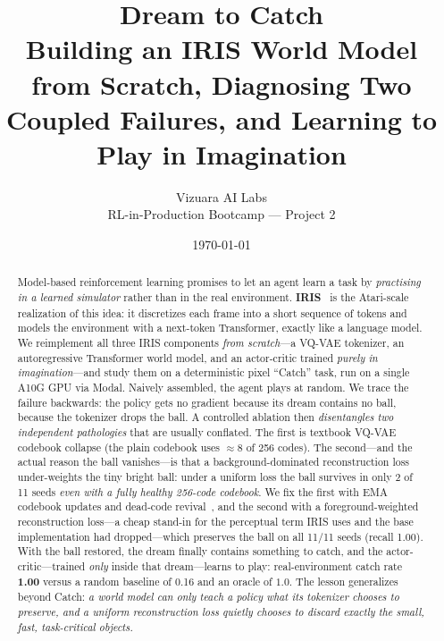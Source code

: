 \documentclass[11pt]{article}
\title{\textbf{Dream to Catch}\\[2pt]
\large Building an IRIS World Model from Scratch, Diagnosing Two Coupled
Failures, and Learning to Play in Imagination}
\author{Vizuara AI Labs \\ \small RL-in-Production Bootcamp --- Project 2}
\date{\today}
\newcommand{\activeAfter}{256}
\newcommand{\nseeds}{11}
\newcommand{\keptEMA}{2}
\newcommand{\keptFG}{11}
\newcommand{\ballFG}{1.00}           %
\newcommand{\activePlain}{8}         %
\newcommand{\catchRate}{1.00}
\newcommand{\randCatch}{0.16}
\begin{document}
\maketitle

\begin{abstract}
Model-based reinforcement learning promises to let an agent learn a task by
\emph{practising in a learned simulator} rather than in the real environment.
\textbf{IRIS}~\cite{iris} is the Atari-scale realization of this idea: it
discretizes each frame into a short sequence of tokens and models the
environment with a next-token Transformer, exactly like a language model. We
reimplement all three IRIS components \emph{from scratch}---a VQ-VAE
tokenizer, an autoregressive Transformer world model, and an actor-critic
trained \emph{purely in imagination}---and study them on a deterministic pixel
``Catch'' task, run on a single A10G GPU via Modal. Naively assembled, the agent
plays at random. We trace the failure backwards: the policy gets no gradient
because its dream contains no ball, because the tokenizer drops the ball. A
controlled ablation then \emph{disentangles two independent pathologies} that
are usually conflated. The first is textbook VQ-VAE codebook collapse (the plain
codebook uses $\approx\activePlain$ of 256 codes). The second---and the actual
reason the ball vanishes---is that a background-dominated reconstruction loss
under-weights the tiny bright ball: under a uniform loss the ball survives in
only \keptEMA{} of \nseeds{} seeds \emph{even with a fully healthy \activeAfter-code
codebook}. We fix the first with EMA codebook updates and dead-code
revival~\cite{vqvae2,jukebox}, and the second with a foreground-weighted
reconstruction loss---a cheap stand-in for the perceptual term IRIS uses and the
base implementation had dropped---which preserves the ball on all
\keptFG/\nseeds{} seeds (recall \ballFG). With the ball restored, the dream
finally contains something to catch, and the actor-critic---trained \emph{only}
inside that dream---learns to play: real-environment catch rate \textbf{\catchRate}
versus a random baseline of \randCatch{} and an oracle of $1.0$. The lesson generalizes beyond Catch:
\emph{a world model can only teach a policy what its tokenizer chooses to
preserve, and a uniform reconstruction loss quietly chooses to discard exactly
the small, fast, task-critical objects.}
\end{abstract}

\end{document}
